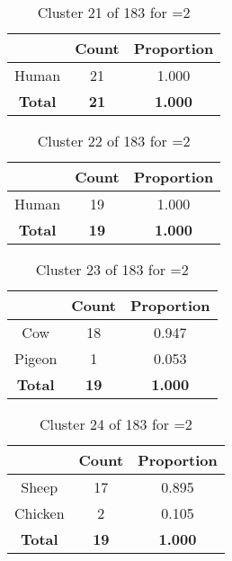 \begin{table}[ht!]
\centering
\begin{tabular}{|c|c|c|}
\hline
\bf \Spec{} &\bf Count &\bf Proportion\\ \hline \hline
Human & 21 & 1.000\\ \hline
\hline
\bf Total & \bf 21 & \bf 1.000\\ \hline
\end{tabular}
\label{tab:cluster:21:2}
\caption{Cluster 21 of 183 for \minneigh{}=2}
\end{table}

\begin{table}[ht!]
\centering
\begin{tabular}{|c|c|c|}
\hline
\bf \Spec{} &\bf Count &\bf Proportion\\ \hline \hline
Human & 19 & 1.000\\ \hline
\hline
\bf Total & \bf 19 & \bf 1.000\\ \hline
\end{tabular}
\label{tab:cluster:22:2}
\caption{Cluster 22 of 183 for \minneigh{}=2}
\end{table}

\begin{table}[ht!]
\centering
\begin{tabular}{|c|c|c|}
\hline
\bf \Spec{} &\bf Count &\bf Proportion\\ \hline \hline
Cow & 18 & 0.947\\ \hline
Pigeon & 1 & 0.053\\ \hline
\hline
\bf Total & \bf 19 & \bf 1.000\\ \hline
\end{tabular}
\label{tab:cluster:23:2}
\caption{Cluster 23 of 183 for \minneigh{}=2}
\end{table}

\begin{table}[ht!]
\centering
\begin{tabular}{|c|c|c|}
\hline
\bf \Spec{} &\bf Count &\bf Proportion\\ \hline \hline
Sheep & 17 & 0.895\\ \hline
Chicken & 2 & 0.105\\ \hline
\hline
\bf Total & \bf 19 & \bf 1.000\\ \hline
\end{tabular}
\label{tab:cluster:24:2}
\caption{Cluster 24 of 183 for \minneigh{}=2}
\end{table}

